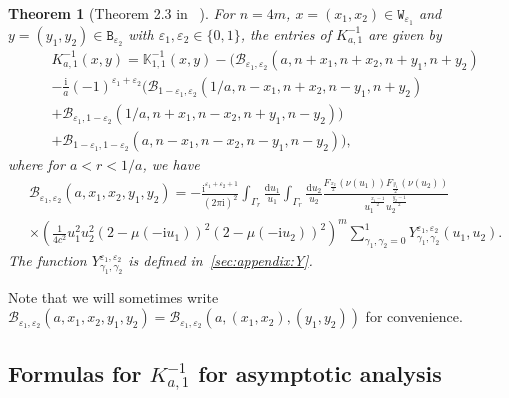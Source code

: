 \documentclass[11pt,twoside]{amsart}
\theoremstyle{plain}
\newtheorem{thm}{Theorem}[section]
\numberwithin{quest}{section}
\theoremstyle{remark}
\numberwithin{rem}{section}
\theoremstyle{definition}
\newcommand{\eps}{\varepsilon}
\begin{document}
	\begin{thm}[Theorem 2.3 in ~\cite{CJ16}] \label{thm:prev:Kinverse}
		For $n=4m$, $x=(x_1,x_2) \in \mathtt{W}_{\eps_1}$ and $y=(y_1,y_2) \in \mathtt{B}_{\eps_2}$ with $\eps_1,\eps_2 \in \{0,1\}$,
		the entries of $K^{-1}_{a,1}$ are given by 
		\begin{equation*} \label{thm:eq:prev:Kinverse}
			\begin{split}
				&K_{a,1}^{-1}(x,y)= \mathbb{K}^{-1}_{1,1} (x,y)
				-\Big( \mathcal{B}_{\eps_1,\eps_2}(a,n+x_1,n+x_2,n+y_1,n+y_2) 
				\\& -\frac{\mathrm{i}}{a} (-1)^{\eps_1+\eps_2} \big( \mathcal{B}_{1-\eps_1,\eps_2}(1/a,n-x_1,n+x_2,n-y_1,n+y_2) \\&   +\mathcal{B}_{\eps_1,1-\eps_2}(1/a,n+x_1,n-x_2,n+y_1,n-y_2) \big) \\
				&  +\mathcal{B}_{1-\eps_1,1-\eps_2}(a,n-x_1,n-x_2,n-y_1,n-y_2) \Big),
			\end{split}
		\end{equation*}
		where for $a<r<1/a$, we have
		\begin{equation}\label{eq:prev:B:first}
			\begin{split}
				&\mathcal{B}_{\eps_1,\eps_2}(a,x_1,x_2,y_1,y_2) =
				-\frac{\mathrm{i}^{\eps_1+\eps_2+1}}{(2 \pi \mathrm{i})^2} \int _{\Gamma_r} \frac{\mathrm{d}u_1}{u_1}\int_{\Gamma_r} \frac{\mathrm{d}u_2}{u_2} \frac{ F_{\frac{x_2}{2}}(\nu (u_1)) F_{\frac{y_1}{2}} (\nu(u_2))}{u_1^{\frac{x_1-1}{2}} u_2^{\frac{y_2-1}{2}}}
				\\
				&\times \left(\frac{1}{4 c^2} u_1^2 u_2^2 (2-\mu(-\mathrm{i}u_1))^2( 2-\mu(-\mathrm{i}u_2))^2 \right)^{m}
				\sum_{\gamma_1,\gamma_2=0}^1Y^{\eps_1,\eps_2}_{\gamma_1,\gamma_2}(u_1,u_2).
			\end{split}
		\end{equation}
		The function $Y_{\gamma_1,\gamma_2}^{\eps_1,\eps_2}$ is defined in~\cref{sec:appendix:Y}.
	\end{thm}
	Note that we will sometimes write $\mathcal{B}_{\eps_1,\eps_2}(a,x_1,x_2,y_1,y_2)=\mathcal{B}_{\eps_1,\eps_2}(a,(x_1,x_2),(y_1,y_2))$ for convenience.  
	
	
	
	\subsection{Formulas for $K_{a,1}^{-1}$ for asymptotic analysis}
	
\end{document}
